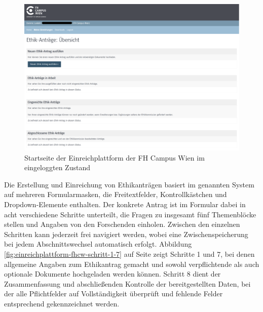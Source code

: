 \documentclass[a4paper,12pt,twoside]{scrreprt}
\begin{document}
\begin{figure}[ht]
    \centering
    \includegraphics[width=\linewidth]{thesis/images/Luidold_Einreichplattform-FH-Campus-Wien.png}
    \caption[Startseite der Einreichplattform der FH Campus Wien im eingeloggten Zustand]{Startseite der Einreichplattform der FH Campus Wien im eingeloggten Zustand \cite{ethikkommission_fh_campus_wien_fh_2023}}
    \label{fig:startseite-einreichplattform-fhcw}
\end{figure}

\medskip 

Die Erstellung und Einreichung von Ethikanträgen basiert im genannten System auf mehreren Formularmasken, die Freitextfelder, Kontrollkästchen und Dropdown-Elemente enthalten. Der konkrete Antrag ist im Formular dabei in acht verschiedene Schritte unterteilt, die Fragen zu insgesamt fünf Themenblöcke stellen und Angaben von den Forschenden einholen. Zwischen den einzelnen Schritten kann jederzeit frei navigiert werden, wobei eine Zwischenspeicherung bei jedem Abschnittswechsel automatisch erfolgt. Abbildung \ref{fig:einreichplattform-fhcw-schritt-1-7} auf Seite \pageref{fig:einreichplattform-fhcw-schritt-1-7} zeigt Schritte 1 und 7, bei denen allgemeine Angaben zum Ethikantrag gemacht und sowohl verpflichtende als auch optionale Dokumente hochgeladen werden können. Schritt 8 dient der Zusammenfassung und abschließenden Kontrolle der bereitgestellten Daten, bei der alle Pflichtfelder auf Vollständigkeit überprüft und fehlende Felder entsprechend gekennzeichnet werden.
\end{document}
